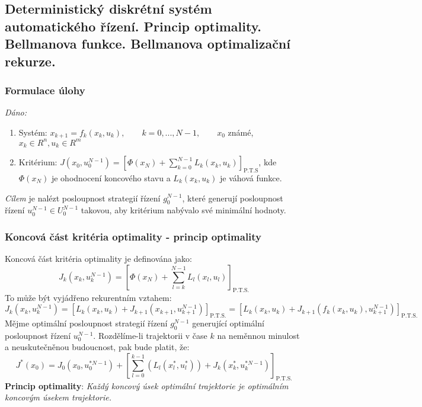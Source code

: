 \subsection{Deterministický diskrétní systém automatického řízení. Princip optimality. Bellmanova funkce. Bellmanova optimalizační rekurze.}
\subsubsection*{Formulace úlohy}
\textit{Dáno:}
\begin{enumerate}
\item Systém: $ x_{k+1} = f_k(x_k, u_k), \qquad k=0,...,N-1, \qquad x_0 $ známé, $ x_k \in R^n, u_k \in R^m $
\item Kritérium: $ J(x_0, u_0^{N-1}) = \left[ \Phi(x_N) + \displaystyle{\sum_{k=0}^{N-1}} L_k(x_k,u_k) \right]_{\mathrm{P.T.S}} $, kde $ \Phi(x_N) $ je ohodnocení koncového stavu a $ L_k(x_k, u_k) $ je váhová funkce.
\end{enumerate}
\textit{Cílem} je nalézt posloupnost strategií řízení $ g_0^{N-1} $, které generují posloupnost řízení $ u_0^{N-1} \in U_0^{N-1} $ takovou, aby kritérium nabývalo své minimální hodnoty.

\subsubsection*{Koncová část kritéria optimality - princip optimality}
Koncová část kritéria optimality je definována jako:
\begin{equation}
J_k(x_k, u_k^{N-1}) = \left[ \Phi(x_N) + \displaystyle{\sum_{l=k}^{N-1}} L_l(x_l,u_l) \right]_{\mathrm{P.T.S.}}
\end{equation}
To může být vyjádřeno rekurentním vztahem:
\begin{equation*}
J_k(x_k, u_k^{N-1}) = \left[ L_k(x_k,u_k) + J_{k+1}(x_{k+1},u_{k+1}^{N-1}) \right]_{\mathrm{P.T.S.}} = \left[ L_k(x_k,u_k) + J_{k+1}(f_k(x_k,u_k), u_{k+1}^{N-1}) \right]_{\mathrm{P.T.S.}}
\end{equation*}
Mějme optimální posloupnost strategií řízení $ g_0^{N-1} $ generující optimální posloupnost řízení $ u_0^{N-1} $. Rozdělíme-li trajektorii v čase $ k $ na neměnnou minulost a neuskutečněnou budoucnost, pak bude platit, že:
\begin{equation*}
J^*(x_0) = J_0(x_0, u_0^{* N-1}) + \left[ \displaystyle{\sum_{l=0}^{k-1}}(L_l(x_l^*, u_l^*)) + J_k(x_k^*,u_k^{* N-1}) \right]_{\mathrm{P.T.S.}}
\end{equation*}
\textbf{Princip optimality}: \textit{Každý koncový úsek optimální trajektorie je optimálním koncovým úsekem trajektorie.}

